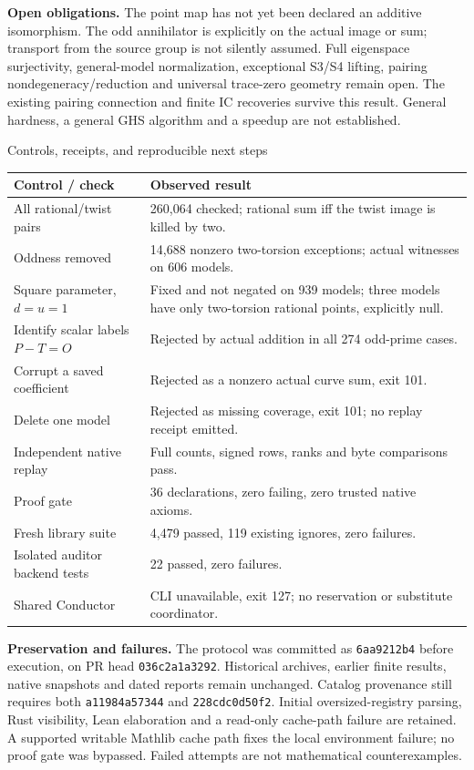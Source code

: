 \documentclass[10pt]{article}
\begin{document}
\textbf{Open obligations.} The point map has not yet been declared an additive
isomorphism. The odd annihilator is explicitly on the actual image or sum;
transport from the source group is not silently assumed. Full eigenspace
surjectivity, general-model normalization, exceptional S3/S4 lifting,
pairing nondegeneracy/reduction and universal trace-zero geometry remain open.
The existing pairing connection and finite IC recoveries survive this result.
General hardness, a general GHS algorithm and a speedup are not established.

\newpage
\begin{center}{\Large Controls, receipts, and reproducible next steps}\end{center}
\begin{center}\small
\begin{tabular}{p{2.45in}p{3.85in}}
\toprule
Control / check & Observed result\\\midrule
All rational/twist pairs & 260,064 checked; rational sum iff the twist image is killed by two.\\
Oddness removed & 14,688 nonzero two-torsion exceptions; actual witnesses on 606 models.\\
Square parameter, $d=u=1$ & Fixed and not negated on 939 models; three models have only two-torsion rational points, explicitly null.\\
Identify scalar labels $P-T=O$ & Rejected by actual addition in all 274 odd-prime cases.\\
Corrupt a saved coefficient & Rejected as a nonzero actual curve sum, exit 101.\\
Delete one model & Rejected as missing coverage, exit 101; no replay receipt emitted.\\
Independent native replay & Full counts, signed rows, ranks and byte comparisons pass.\\
Proof gate & 36 declarations, zero failing, zero trusted native axioms.\\
Fresh library suite & 4,479 passed, 119 existing ignores, zero failures.\\
Isolated auditor backend tests & 22 passed, zero failures.\\
Shared Conductor & CLI unavailable, exit 127; no reservation or substitute coordinator.\\\bottomrule
\end{tabular}\normalsize\end{center}

\textbf{Preservation and failures.} The protocol was committed as
\texttt{6aa9212b4} before execution, on PR head \texttt{036c2a1a3292}.
Historical archives, earlier finite results, native snapshots and dated reports
remain unchanged. Catalog provenance still requires both \texttt{a11984a57344}
and \texttt{228cdc0d50f2}. Initial oversized-registry parsing, Rust visibility,
Lean elaboration and a read-only cache-path failure are retained. A supported
writable Mathlib cache path fixes the local environment failure; no proof gate
was bypassed. Failed attempts are not mathematical counterexamples.
\end{document}
